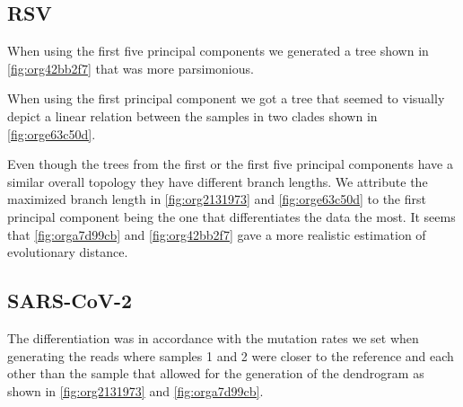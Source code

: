 \documentclass[10pt, a4paper]{article}
\begin{document}
\subsection{RSV}
\label{sec:orgc3908b7}
When using the first five principal components we generated a tree shown in 
\ref{fig:org42bb2f7} that was more parsimonious.

When using the first principal component we got a tree that seemed to visually
depict a linear relation between the samples in two clades shown in
\ref{fig:orge63c50d}.

Even though the trees from the first or the first five principal components 
have a similar overall topology they have different branch lengths. 
We attribute the maximized branch length in \ref{fig:org2131973} and 
\ref{fig:orge63c50d} to the
first principal component being the one that differentiates the data the most.
It seems that \ref{fig:orga7d99cb} and \ref{fig:org42bb2f7} gave a more realistic
estimation of evolutionary distance.

\subsection{SARS-CoV-2}
\label{sec:org1e6a46b}
The differentiation was in accordance with the mutation rates we set when 
generating the reads where samples 1 and 2 were closer to the reference and each
other than the sample that allowed for the generation of the dendrogram as shown 
in \ref{fig:org2131973} and \ref{fig:orga7d99cb}.
\end{document}
